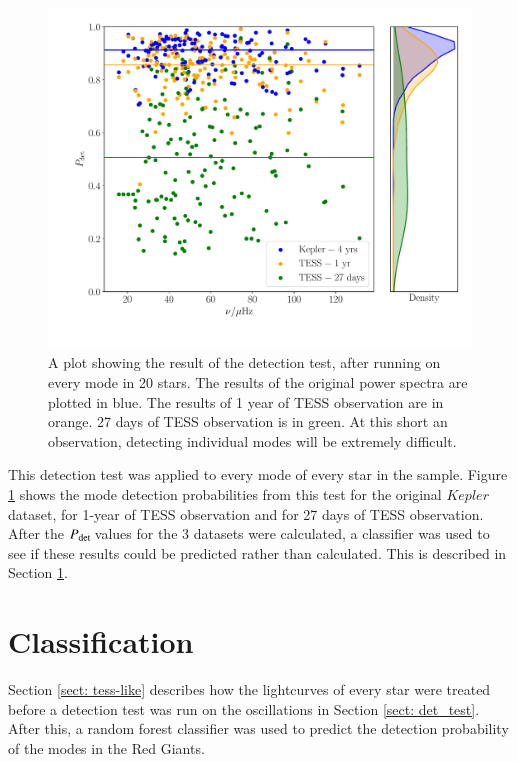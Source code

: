 \documentclass[a4paper,fleqn,usenatbib,useAMS]{mnras}
\newcommand{\kep}{\ensuremath{Kepler}\:}
\newcommand{\pdet}{\ensuremath{P_{\rm det}\:}}
\begin{document}
\begin{figure}
	\centering
	\includegraphics[scale=0.3]{DetTest_Diagnostic_plot3.pdf}
	\caption{A plot showing the result of the detection test, after running on every mode in 20 stars. The results of the original power spectra are plotted in blue. The results of 1 year of TESS observation are in orange. 27 days of TESS observation is in green. At this short an observation, detecting individual modes will be extremely difficult.}	
	\label{fig: modes}
\end{figure}

This detection test was applied to every mode of every star in the sample. Figure \ref{fig: modes} shows the mode detection probabilities from this test for the original \kep dataset, for 1-year of TESS observation and for 27 days of TESS observation. After the \pdet values for the 3 datasets were calculated, a classifier was used to see if these results could be predicted rather than calculated. This is described in Section \ref{sect: classifier}.


\section{Classification}
\label{sect: classifier}

Section \ref{sect: tess-like} describes how the lightcurves of every star were treated before a detection test was run on the oscillations in Section \ref{sect: det_test}. After this, a random forest classifier was used to predict the detection probability of the modes in the Red Giants. 
\end{document}
